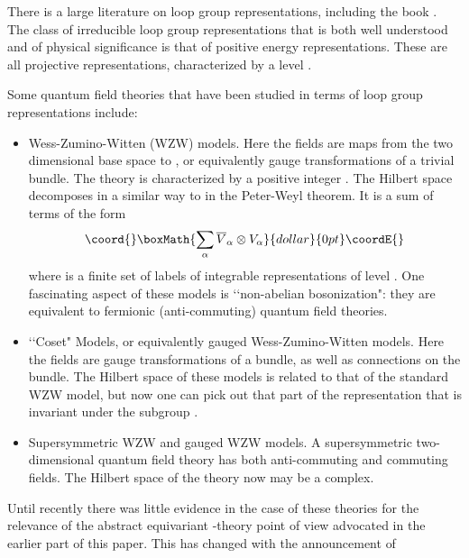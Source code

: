 \documentclass[a4paper,a4paper]{article}
\theoremstyle{conjecture}
\begin{document}
There is a large literature on loop group representations, including the book \cite{PS}.  The class of irreducible loop group
representations that is both well understood and of physical significance is that of positive energy representations.  These are all
projective representations, characterized by a level \coordHE{}.

Some quantum field theories that have been studied in terms of loop group representations include:
\begin{itemize}
\item Wess-Zumino-Witten (WZW) models.  Here the fields are maps from the two dimensional base space to \coordHE{}, or equivalently gauge
transformations of a trivial bundle.  The theory is characterized by a positive integer \coordHE{}.  The Hilbert space decomposes in a similar
way to \coordHE{} in the Peter-Weyl theorem. It is a sum of terms of
the form
$$\coord{}\boxMath{ \sum_{\alpha}{\overline V_\alpha}\otimes {V_\alpha}}{dollar}{0pt}\coordE{}$$
where \myHighlight{$\alpha$}\coordHE{} is a finite set of labels of integrable \coordHE{} representations of level \coordHE{}.  One fascinating aspect of these
models is \lq\lq non-abelian bosonization": they are equivalent to fermionic (anti-commuting)  quantum field theories.

\item {}\coordHE{} \lq\lq Coset" Models, or equivalently gauged Wess-Zumino-Witten models.  Here the fields are gauge transformations
of a bundle, as well as connections on the bundle.  The Hilbert space of these models is related to that of the standard WZW
model, but now one can pick out that part of the representation that is invariant under the subgroup \coordHE{}.

\item Supersymmetric WZW and gauged WZW models.  A supersymmetric two-dimensional quantum field theory has both anti-commuting
and commuting fields.  The Hilbert space of the theory now may be a complex.

\end{itemize}

Until recently there was little evidence in the case of these theories for the relevance of the abstract
equivariant \coordHE{}-theory point of view advocated in the earlier part of this paper.  This has changed with
the announcement \cite{Freed2} of
\end{document}
